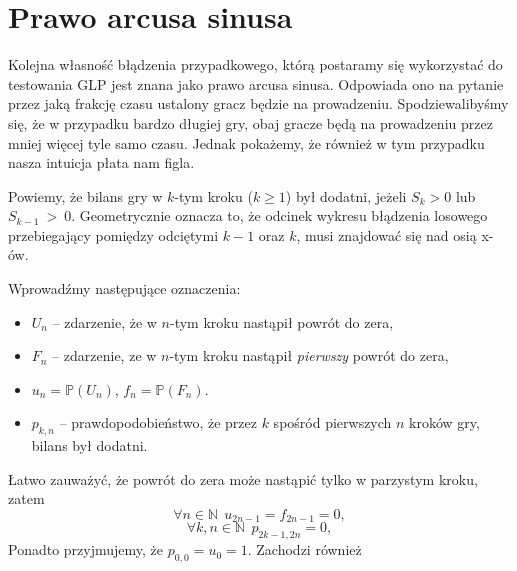 \documentclass[a4paper,11pt,oneside]{book}
\newcommand{\Prob}{\mathbb{P}}
\begin{document}
\section{Prawo arcusa sinusa}
Kolejna własność błądzenia przypadkowego, którą postaramy się wykorzystać do testowania GLP jest znana jako prawo arcusa sinusa. Odpowiada ono na pytanie przez jaką frakcję czasu ustalony gracz będzie na prowadzeniu. Spodziewalibyśmy się, że w przypadku bardzo długiej gry, obaj gracze będą na prowadzeniu przez mniej więcej tyle samo czasu. Jednak pokażemy, że również w tym przypadku nasza intuicja płata nam figla.

Powiemy, że bilans gry w $k$-tym kroku ($k \geq 1$) był dodatni, jeżeli $S_k > 0$ lub $S_{k-1}~>~0$. Geometrycznie oznacza to, że odcinek wykresu błądzenia losowego przebiegający pomiędzy odciętymi $k-1$ oraz $k$, musi znajdować się nad osią x-ów.

Wprowadźmy następujące oznaczenia:
\begin{itemize}
  \setlength\itemsep{1pt}
 \item $U_n$ -- zdarzenie, że w $n$-tym kroku nastąpił powrót do zera,
 \item $F_n$ -- zdarzenie, ze w $n$-tym kroku nastąpił \emph{pierwszy} powrót do zera,
 \item $u_n = \Prob(U_n)$, $f_n = \Prob(F_n)$.
 \item $p_{k,n}$ -- prawdopodobieństwo, że przez $k$ spośród pierwszych $n$ kroków gry, bilans był dodatni.
\end{itemize}
Łatwo zauważyć, że powrót do zera może nastąpić tylko w parzystym kroku, zatem
\[ \forall n \in \mathbb{N}\ \ u_{2n-1} = f_{2n-1} = 0, \]
\[ \forall k,n \in \mathbb{N}\ \ p_{2k-1, 2n} = 0, \]
Ponadto przyjmujemy, że $p_{0,0} = u_0 = 1$. Zachodzi również
\end{document}
